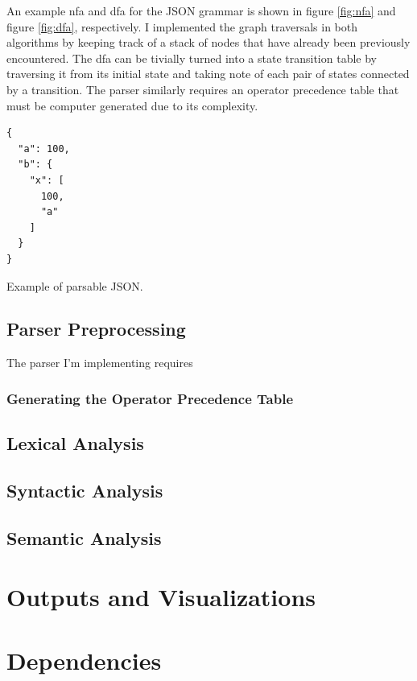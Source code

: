 An example \gls{nfa} and \gls{dfa} for the JSON grammar is shown in figure \ref{fig:nfa} and figure
\ref{fig:dfa}, respectively. I implemented the graph traversals in both algorithms by keeping track
of a stack of nodes that have already been previously encountered. The \gls{dfa} can be tivially
turned into a state transition table by traversing it from its initial state and  taking note of
each pair of states connected by a transition. The parser similarly requires an operator precedence
table that must be computer generated due to its complexity.

\begin{listing}[t]
\begin{verbatim}
{
  "a": 100,
  "b": {
    "x": [
      100,
      "a"
    ]
  }
}
\end{verbatim}
\caption{Example of parsable JSON.}
\hrulefill
\label{lst:json_example}
\end{listing}

\subsection{Parser Preprocessing}

The parser I'm implementing requires 

\subsubsection{Generating the Operator Precedence Table}

\subsection{Lexical Analysis}

\subsection{Syntactic Analysis}

\subsection{Semantic Analysis}

\section{Outputs and Visualizations} \label{outputs_and_visualizations}

\section{Dependencies} \label{dependancies}

